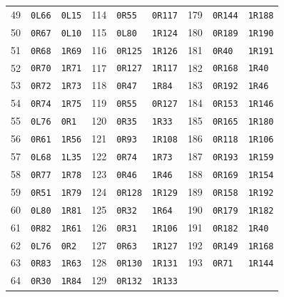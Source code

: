 {\begin{longtable}{@{}rll@{\hspace{1.8em}}rll@{\hspace{1.8em}}rll@{}}
49 & \texttt{0L66} & \texttt{0L15} & 114 & \texttt{0R55} & \texttt{0R117} & 179 & \texttt{0R144} & \texttt{1R188}\\
50 & \texttt{0R67} & \texttt{0L10} & 115 & \texttt{0L80} & \texttt{1R124} & 180 & \texttt{0R189} & \texttt{1R190}\\
51 & \texttt{0R68} & \texttt{1R69} & 116 & \texttt{0R125} & \texttt{1R126} & 181 & \texttt{0R40} & \texttt{1R191}\\
52 & \texttt{0R70} & \texttt{1R71} & 117 & \texttt{0R127} & \texttt{1R117} & 182 & \texttt{0R168} & \texttt{1R40}\\
53 & \texttt{0R72} & \texttt{1R73} & 118 & \texttt{0R47} & \texttt{1R84} & 183 & \texttt{0R192} & \texttt{1R46}\\
54 & \texttt{0R74} & \texttt{1R75} & 119 & \texttt{0R55} & \texttt{0R127} & 184 & \texttt{0R153} & \texttt{1R146}\\
55 & \texttt{0L76} & \texttt{0R1} & 120 & \texttt{0R35} & \texttt{1R33} & 185 & \texttt{0R165} & \texttt{1R180}\\
56 & \texttt{0R61} & \texttt{1R56} & 121 & \texttt{0R93} & \texttt{1R108} & 186 & \texttt{0R118} & \texttt{1R106}\\
57 & \texttt{0L68} & \texttt{1L35} & 122 & \texttt{0R74} & \texttt{1R73} & 187 & \texttt{0R193} & \texttt{1R159}\\
58 & \texttt{0R77} & \texttt{1R78} & 123 & \texttt{0R46} & \texttt{1R46} & 188 & \texttt{0R169} & \texttt{1R154}\\
59 & \texttt{0R51} & \texttt{1R79} & 124 & \texttt{0R128} & \texttt{1R129} & 189 & \texttt{0R158} & \texttt{1R192}\\
60 & \texttt{0L80} & \texttt{1R81} & 125 & \texttt{0R32} & \texttt{1R64} & 190 & \texttt{0R179} & \texttt{1R182}\\
61 & \texttt{0R82} & \texttt{1R61} & 126 & \texttt{0R31} & \texttt{1R106} & 191 & \texttt{0R182} & \texttt{1R40}\\
62 & \texttt{0L76} & \texttt{0R2} & 127 & \texttt{0R63} & \texttt{1R127} & 192 & \texttt{0R149} & \texttt{1R168}\\
63 & \texttt{0R83} & \texttt{1R63} & 128 & \texttt{0R130} & \texttt{1R131} & 193 & \texttt{0R71} & \texttt{1R144}\\
64 & \texttt{0R30} & \texttt{1R84} & 129 & \texttt{0R132} & \texttt{1R133} &  &  & \\
\bottomrule\end{longtable}}
